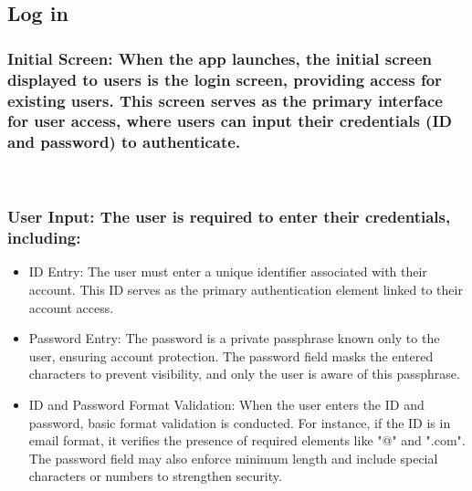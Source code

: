 \documentclass[conference]{IEEEtran}
\begin{document}
\subsection{Log in}

\subsubsection{Initial Screen: When the app launches, the initial screen displayed to users is the login screen, providing access for existing users. This screen serves as the primary interface for user access, where users can input their credentials (ID and password) to authenticate.}

\
\subsubsection{User Input: The user is required to enter their credentials, including:}
\begin{itemize}
    \item ID Entry: The user must enter a unique identifier associated with their account. This ID serves as the primary authentication element linked to their account access.\\
    \item Password Entry: The password is a private passphrase known only to the user, ensuring account protection. The password field masks the entered characters to prevent visibility, and only the user is aware of this passphrase.\\
    \item ID and Password Format Validation: When the user enters the ID and password, basic format validation is conducted. For instance, if the ID is in email format, it verifies the presence of required elements like "@" and ".com". The password field may also enforce minimum length and include special characters or numbers to strengthen security.\\
\end{itemize}
\end{document}
